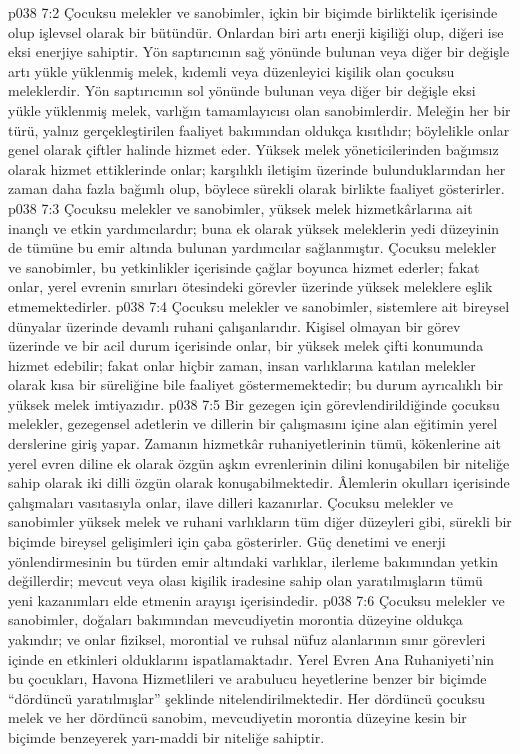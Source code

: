 \vs p038 7:2 Çocuksu melekler ve sanobimler, içkin bir biçimde birliktelik içerisinde olup işlevsel olarak bir bütündür. Onlardan biri artı enerji kişiliği olup, diğeri ise eksi enerjiye sahiptir. Yön saptırıcının sağ yönünde bulunan veya diğer bir değişle artı yükle yüklenmiş melek, kıdemli veya düzenleyici kişilik olan çocuksu meleklerdir. Yön saptırıcının sol yönünde bulunan veya diğer bir değişle eksi yükle yüklenmiş melek, varlığın tamamlayıcısı olan sanobimlerdir. Meleğin her bir türü, yalnız gerçekleştirilen faaliyet bakımından oldukça kısıtlıdır; böylelikle onlar genel olarak çiftler halinde hizmet eder. Yüksek melek yöneticilerinden bağımsız olarak hizmet ettiklerinde onlar; karşılıklı iletişim üzerinde bulunduklarından her zaman daha fazla bağımlı olup, böylece sürekli olarak birlikte faaliyet gösterirler.
\vs p038 7:3 Çocuksu melekler ve sanobimler, yüksek melek hizmetkârlarına ait inançlı ve etkin yardımcılardır; buna ek olarak yüksek meleklerin yedi düzeyinin de tümüne bu emir altında bulunan yardımcılar sağlanmıştır. Çocuksu melekler ve sanobimler, bu yetkinlikler içerisinde çağlar boyunca hizmet ederler; fakat onlar, yerel evrenin sınırları ötesindeki görevler üzerinde yüksek meleklere eşlik etmemektedirler.
\vs p038 7:4 Çocuksu melekler ve sanobimler, sistemlere ait bireysel dünyalar üzerinde devamlı ruhani çalışanlarıdır. Kişisel olmayan bir görev üzerinde ve bir acil durum içerisinde onlar, bir yüksek melek çifti konumunda hizmet edebilir; fakat onlar hiçbir zaman, insan varlıklarına katılan melekler olarak kısa bir süreliğine bile faaliyet göstermemektedir; bu durum ayrıcalıklı bir yüksek melek imtiyazıdır.
\vs p038 7:5 Bir gezegen için görevlendirildiğinde çocuksu melekler, gezegensel adetlerin ve dillerin bir çalışmasını içine alan eğitimin yerel derslerine giriş yapar. Zamanın hizmetkâr ruhaniyetlerinin tümü, kökenlerine ait yerel evren diline ek olarak özgün aşkın evrenlerinin dilini konuşabilen bir niteliğe sahip olarak iki dilli özgün olarak konuşabilmektedir. Âlemlerin okulları içerisinde çalışmaları vasıtasıyla onlar, ilave dilleri kazanırlar. Çocuksu melekler ve sanobimler yüksek melek ve ruhani varlıkların tüm diğer düzeyleri gibi, sürekli bir biçimde bireysel gelişimleri için çaba gösterirler. Güç denetimi ve enerji yönlendirmesinin bu türden emir altındaki varlıklar, ilerleme bakımından yetkin değillerdir; mevcut veya olası kişilik iradesine sahip olan yaratılmışların tümü yeni kazanımları elde etmenin arayışı içerisindedir.
\vs p038 7:6 Çocuksu melekler ve sanobimler, doğaları bakımından mevcudiyetin morontia düzeyine oldukça yakındır; ve onlar fiziksel, morontial ve ruhsal nüfuz alanlarının sınır görevleri içinde en etkinleri olduklarını ispatlamaktadır. Yerel Evren Ana Ruhaniyeti’nin bu çocukları, Havona Hizmetlileri ve arabulucu heyetlerine benzer bir biçimde “dördüncü yaratılmışlar” şeklinde nitelendirilmektedir. Her dördüncü çocuksu melek ve her dördüncü sanobim, mevcudiyetin morontia düzeyine kesin bir biçimde benzeyerek yarı\hyp{}maddi bir niteliğe sahiptir.
